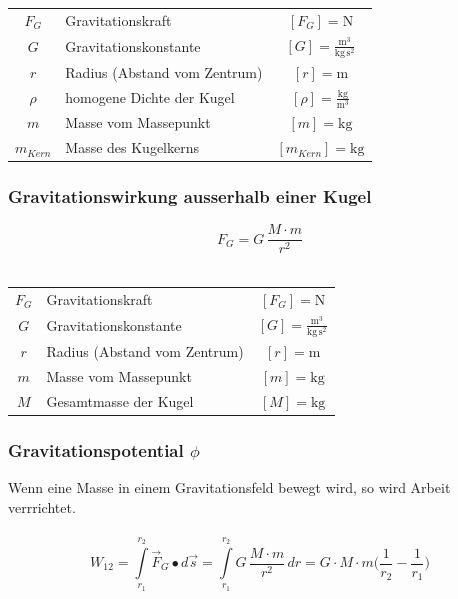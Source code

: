 	\begin{tabular}{c l c}
	$F_G$ & Gravitationskraft & $[F_G] = \mathrm{N}$ \\
	$G$ & Gravitationskonstante & $[G] = \mathrm{\frac{m^3}{kg \, s^2}}$ \\	
	$r$ & Radius (Abstand vom Zentrum) & $[r] = \mathrm{m}$ \\
	$\rho$ & homogene Dichte der Kugel & $[\rho] = \mathrm{\frac{kg}{m^3}}$ \\
	$m$ & Masse vom Massepunkt & $[m] = \mathrm{kg}$ \\
	$m_{Kern}$ & Masse des Kugelkerns & $[m_{Kern}] = \mathrm{kg}$ \\
	\end{tabular}
	
	
	
	
	\subsubsection{Gravitationswirkung ausserhalb einer Kugel}
	
	$$ \boxed{ F_G = G \, \frac{M \cdot m}{r^2}}  $$ \\
	
	\begin{tabular}{c l c}
	$F_G$ & Gravitationskraft & $[F_G] = \mathrm{N}$ \\
	$G$ & Gravitationskonstante & $[G] = \mathrm{\frac{m^3}{kg \, s^2}}$ \\	
	$r$ & Radius (Abstand vom Zentrum) & $[r] = \mathrm{m}$ \\
	$m$ & Masse vom Massepunkt & $[m] = \mathrm{kg}$ \\
	$M$ & Gesamtmasse der Kugel & $[M] = \mathrm{kg}$ \\
	\end{tabular}
	
	
	\vfill\null
	\columnbreak
	
	
	
	\subsubsection{Gravitationspotential  $\phi$}
	
	Wenn eine Masse in einem Gravitationsfeld bewegt wird, so wird Arbeit verrrichtet. \\
	\\
	
	$$ \boxed{ W_{12} = \int \limits_{r_1}^{r_2} \vec{F}_G \bullet d \vec{s}  =  \int \limits_{r_1}^{r_2} G \, \frac{M \cdot m}{r^2} \, dr = G \cdot M \cdot m \big( \frac{1}{r_2} - \frac{1}{r_1}  \big) }  $$  
	
